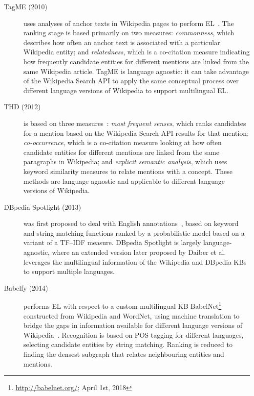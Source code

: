 \documentclass{llncs}
\begin{document}
\begin{description}
\item[TagME (2010)] uses analyses of anchor texts in Wikipedia pages to perform EL~\cite{ferragina2010tagme}. The ranking stage is based primarily on two measures: \textit{commonness}, which describes how often an anchor text is associated with a particular Wikipedia entity; and \textit{relatedness}, which is a co-citation measure indicating how frequently candidate entities for different mentions are linked from the same Wikipedia article. TagME is language agnostic: it can take advantage of the Wikipedia Search API to apply the same conceptual process over different language versions of Wikipedia to support multilingual EL.
\item[THD (2012)] is based on three measures~\cite{THD-dojchinovski2012recognizing}: \textit{most frequent senses}, which ranks candidates for a mention based on the Wikipedia Search API results for that mention; \textit{co-occurrence}, which is a co-citation measure looking at how often candidate entities for different mentions are linked from the same paragraphs in Wikipedia; and \textit{explicit semantic analysis}, which uses keyword similarity measures to relate mentions with a concept. These methods are language agnostic and applicable to different language versions of Wikipedia.
\item[DBpedia Spotlight (2013)] was first proposed to deal with English annotations~\cite{mendes2011dbpedia}, based on keyword and string matching functions ranked by a probabilistic model based on a variant of a TF--IDF measure. DBpedia Spotlight is largely language-agnostic, where an extended version later proposed by Daiber et al.~\cite{daiber2013improving} leverages the multilingual information of the Wikipedia and DBpedia KBs to support multiple languages.
\item[Babelfy (2014)] performs EL with respect to a custom multilingual KB BabelNet\footnote{\url{http://babelnet.org/}; April 1st, 2018} constructed from Wikipedia and WordNet, using machine translation to bridge the gaps in information available for different language versions of Wikipedia~\cite{Babelfy-moro2014entity}. Recognition is based on POS tagging for different languages, selecting candidate entities by string matching. Ranking is reduced to finding the densest subgraph that relates neighbouring entities and mentions.

\end{description}
\end{document}
